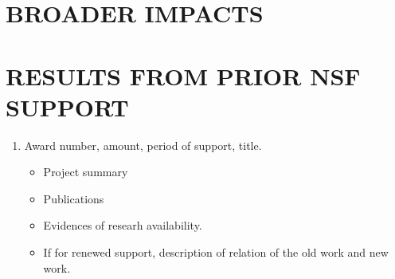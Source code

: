 \documentclass[./preamble.tex]{subfiles}
\begin{document}
%
%
\section{BROADER IMPACTS} %
%
%


%
%
\section{RESULTS FROM PRIOR NSF SUPPORT} %
%
% 
%
%
\begin{enumerate}
    \item Award number, amount, period of support, title. 
    \begin{itemize}
        \item      Project summary
        \item      Publications
        \item      Evidences of researh availability.
        \item      If for renewed support, description of relation of the old work and new work.
    \end{itemize}
     
\end{enumerate}

\newpage

%
%


\AtBeginShipout{%
\AtBeginShipoutDiscard
}
\renewcommand\refname{References Cited}






\end{document}
